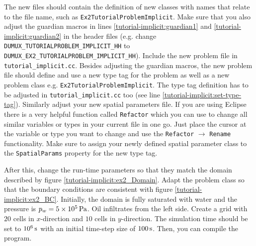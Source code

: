 The new files should contain the definition of new classes with names
that relate to the file name, such as
\texttt{Ex2TutorialProblemImplicit}. Make sure that you also adjust the
guardian macros in lines \ref{tutorial-implicit:guardian1} and
\ref{tutorial-implicit:guardian2}
in the header files (e.g. change
\mbox{\texttt{DUMUX\_TUTORIALPROBLEM\_IMPLICIT\_HH}} to\\
\mbox{\texttt{DUMUX\_EX2\_TUTORIALPROBLEM\_IMPLICIT\_HH}}). Include the new problem file in \texttt{tutorial\_implicit.cc}.
Besides adjusting the guardian macros, the new problem file should define and
use a new type tag for the problem as well as a new problem class
e.g. \mbox{\texttt{Ex2TutorialProblemImplicit}}. The type tag definition has
to be adjusted in \texttt{tutorial\_implicit.cc} too (see line \ref{tutorial-implicit:set-type-tag}).
Similarly adjust your new spatial parameters file. If you are using Eclipse there is
a very helpful function called \texttt{Refactor} which you can use to change
all similar variables or types in your current file in one go. Just place the
cursor at the variable or type you want to change
and use the \texttt{Refactor} $\rightarrow$ \texttt{Rename} functionality. Make sure to assign your
newly defined spatial parameter class to the
\texttt{SpatialParams} property for the new
type tag.

After this, change the run-time parameters so that they match the
domain described by figure \ref{tutorial-implicit:ex2_Domain}. Adapt
the problem class so that the boundary conditions are consistent with
figure \ref{tutorial-implicit:ex2_BC}. Initially, the domain is fully
saturated with water and the pressure is $p_w = \unit[5 \times
10^5]{Pa}$. Oil infiltrates from the left side. Create a grid
with $20$ cells in $x$-direction and $10$ cells in $y$-direction. The
simulation time should be set to $\unit[10^6]{s}$ with an
initial time-step size of $\unit[100]{s}$. Then, you can compile the program.


